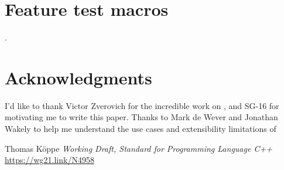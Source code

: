\documentclass{wg21}
\begin{document}
\section{Feature test macros}

.


\section{Acknowledgments}

I'd like to thank Victor Zverovich for the incredible work on ,
and SG-16 for motivating me to write this paper.
Thanks to Mark de Wever and Jonathan Wakely to help me understand the use cases and extensibility limitations
of 





\renewcommand{\section}[2]{}%

\begin{thebibliography}{9}

Thomas Köppe
\emph{Working Draft, Standard for Programming Language C++}\newline
\url{https://wg21.link/N4958}


\end{thebibliography}
\end{document}
